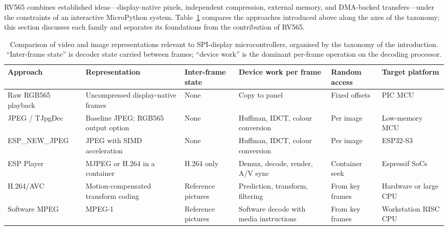 \documentclass[11pt,twocolumn]{article}
\newcommand{\system}{RV565}
\begin{document}
\system{} combines established ideas---display-native pixels, independent
compression, external memory, and DMA-backed transfers---under the constraints
of an interactive MicroPython system.  Table~\ref{tab:literature} compares the
approaches introduced above along the axes of the taxonomy; this section
discusses each family and separates its foundations from the contribution of
\system{}.

\begin{table}[t]
\centering
\caption{Comparison of video and image representations relevant to
SPI-display microcontrollers, organised by the taxonomy of the introduction.
``Inter-frame state'' is decoder state carried between frames; ``device
work'' is the dominant per-frame operation on the decoding processor.}
\label{tab:literature}
\small
\setlength{\tabcolsep}{4pt}
\begin{tabular}{@{}>{\raggedright\arraybackslash}p{}%
                >{\raggedright\arraybackslash}p{}%
                >{\raggedright\arraybackslash}p{}%
                >{\raggedright\arraybackslash}p{}%
                >{\raggedright\arraybackslash}p{}%
                >{\raggedright\arraybackslash}p{}@{}}
\toprule
Approach & Representation & Inter-frame state & Device work per frame & Random access & Target platform \\
\midrule
Raw RGB565 playback~\cite{microchip2012video} & Uncompressed display-native frames & None & Copy to panel & Fixed offsets & PIC MCU \\
JPEG / TJpgDec~\cite{wallace1991jpeg,chan2021tjpgd} & Baseline JPEG; RGB565 output option & None & Huffman, IDCT, colour conversion & Per image & Low-memory MCU \\
ESP\_NEW\_JPEG~\cite{espressif2026newjpeg} & JPEG with SIMD acceleration & None & Huffman, IDCT, colour conversion & Per image & ESP32-S3 \\
ESP Player~\cite{espressif2026player} & MJPEG or H.264 in a container & H.264 only & Demux, decode, render, A/V sync & Container seek & Espressif SoCs \\
H.264/AVC~\cite{wiegand2003overview} & Motion-compensated transform coding & Reference pictures & Prediction, transform, filtering & From key frames & Hardware or large CPU \\
Software MPEG~\cite{lee1995realtime} & MPEG-1 & Reference pictures & Software decode with media instructions & From key frames & Workstation RISC CPU \\

\end{tabular}
\end{table}
\end{document}
